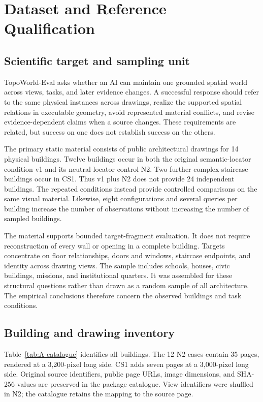 \section{Dataset and Reference Qualification}\label{app:A}
\subsection{Scientific target and sampling unit}
TopoWorld-Eval asks whether an AI can maintain one grounded spatial world across views, tasks, and later evidence changes. A successful response should refer to the same physical instances across drawings, realize the supported spatial relations in executable geometry, avoid represented material conflicts, and revise evidence-dependent claims when a source changes. These requirements are related, but success on one does not establish success on the others.

The primary static material consists of public architectural drawings for 14 physical buildings. Twelve buildings occur in both the original semantic-locator condition v1 and its neutral-locator control N2. Two further complex-staircase buildings occur in CS1. Thus v1 plus N2 does not provide 24 independent buildings. The repeated conditions instead provide controlled comparisons on the same visual material. Likewise, eight configurations and several queries per building increase the number of observations without increasing the number of sampled buildings.

The material supports bounded target-fragment evaluation. It does not require reconstruction of every wall or opening in a complete building. Targets concentrate on floor relationships, doors and windows, staircase endpoints, and identity across drawing views. The sample includes schools, houses, civic buildings, missions, and institutional quarters. It was assembled for these structural questions rather than drawn as a random sample of all architecture. The empirical conclusions therefore concern the observed buildings and task conditions.

\subsection{Building and drawing inventory}
Table~\ref{tab:A-catalogue} identifies all buildings. The 12 N2 cases contain 35 pages, rendered at a 3,200-pixel long side. CS1 adds seven pages at a 3,000-pixel long side. Original source identifiers, public page URLs, image dimensions, and SHA-256 values are preserved in the package catalogue. View identifiers were shuffled in N2; the catalogue retains the mapping to the source page.

